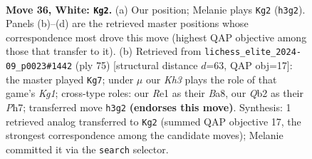\documentclass[11pt]{article}
\begin{document}
\clearpage

\begin{figure}[p]\centering
\begin{subfigure}{0.46\textwidth}\centering
\resizebox{\linewidth}{!}{%
\newchessgame
\chessboard[
  setfen={r3b1k1/p4pP1/8/p6r/4pq2/PP5K/1Q3P2/3RR3 w - - 2 36},
  showmover=false,
  pgfstyle=straightmove, color=movearrow, markmove={h3-g2}
]}
\caption{}
\end{subfigure}\hfill
\begin{subfigure}{0.46\textwidth}\centering
\resizebox{\linewidth}{!}{%
\newchessgame
\chessboard[
  setfen={br4k1/7p/p2q1pp1/2pP4/7P/2Q3P1/P2R1PB1/6K1 b - - 0 38},
  showmover=false,
  pgfstyle=straightmove, color=movearrow, markmove={g8-g7}
]}
\caption{}
\end{subfigure}
\\[4pt]

\caption{\textbf{Move 36, White: \texttt{Kg2}.} (a) Our position; Melanie plays \texttt{Kg2} (\texttt{h3g2}). Panels (b)--(d) are the retrieved master positions whose correspondence most drove this move (highest QAP objective among those that transfer to it). (b) Retrieved from \texttt{lichess\_elite\_2024-09\_p0023\#1442} (ply 75) [structural distance $d$=63, QAP obj=17]: the master played \texttt{Kg7}; under $\mu$ our \emph{Kh3} plays the role of that game's \emph{Kg1}; cross-type roles: our \emph{R}e1 as their \emph{B}a8, our \emph{Q}b2 as their \emph{P}h7; transferred move \texttt{h3g2} \textbf{(endorses this move)}. Synthesis: 1 retrieved analog transferred to \texttt{Kg2} (summed QAP objective 17, the strongest correspondence among the candidate moves); Melanie committed it via the \texttt{search} selector.}
\label{fig:thought-m70}
\end{figure}

\clearpage
\end{document}
